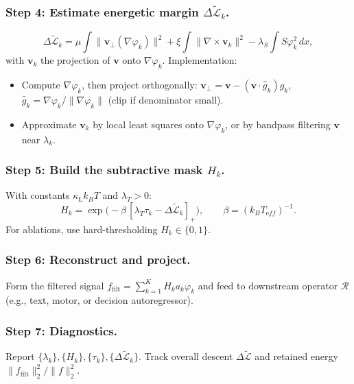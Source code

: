 \documentclass[a4paper,11pt]{article}
\begin{document}
\subsubsection{Step 4: Estimate energetic margin $\Delta\widetilde{\mathcal{L}}_k$.}
\begin{equation}
\Delta\widetilde{\mathcal{L}}_k
=
\mu\int \|\mathbf v_\perp(\nabla\varphi_k)\|^2
+\xi \int \|\nabla\times \mathbf v_k\|^2
-\lambda_S \int S\varphi_k^2 \, dx,
\end{equation}
with $\mathbf v_k$ the projection of $\mathbf v$ onto $\nabla\varphi_k$.
Implementation:
\begin{itemize}
\item Compute $\nabla\varphi_k$, then project orthogonally:
$\mathbf v_\perp=\mathbf v-(\mathbf v\cdot \hat g_k)\hat g_k$,
$\hat g_k=\nabla\varphi_k/\|\nabla\varphi_k\|$ (clip if denominator small).
\item Approximate $\mathbf v_k$ by local least squares onto
$\nabla\varphi_k$, or by bandpass filtering $\mathbf v$ near $\lambda_k$.
\end{itemize}

\subsubsection{Step 5: Build the subtractive mask $H_k$.}
With constants $\kappa_{\mathrm L}k_B T$ and $\lambda_T>0$:
\begin{equation}
H_k=
\exp\!\big(-\beta\,[\lambda_T \tau_k - \Delta\widetilde{\mathcal{L}}_k]_+\big),
\qquad
\beta=(k_B T_{\mathrm eff})^{-1}.
\end{equation}
For ablations, use hard-thresholding $H_k\in\{0,1\}$.

\subsubsection{Step 6: Reconstruct and project.}
Form the filtered signal
$f_{\mathrm{filt}}=\sum_{k=1}^K H_k a_k \varphi_k$
and feed to downstream operator $\mathcal{R}$
(e.g., text, motor, or decision autoregressor).

\subsubsection{Step 7: Diagnostics.}
Report $\{\lambda_k\},\{H_k\},\{\tau_k\},\{\Delta\widetilde{\mathcal{L}}_k\}$.
Track overall descent $\Delta\widetilde{\mathcal{L}}$ and retained energy
$\|f_{\mathrm{filt}}\|_2^2/\|f\|_2^2$.
\end{document}
